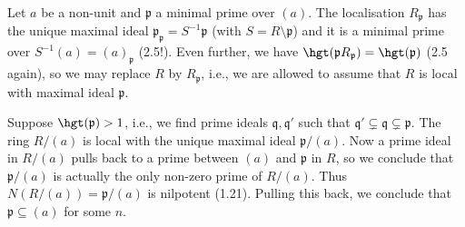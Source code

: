 Let $a$ be a non-unit and $\mathfrak{p}$ a minimal prime over $(a)$. The
localisation $R_{\mathfrak{p}}$ has the unique maximal ideal
$\mathfrak{p}_{\mathfrak{p}} = S^{-1}\mathfrak{p}$ (with $S = R\setminus \mathfrak{p}$)
and it is a minimal prime over $S^{-1}(a) = (a)_{\mathfrak{p}}$ (2.5!). Even
further, we have $\hgt(\mathfrak{p}R_{\mathfrak{p}}) = \hgt(\mathfrak{p})$ (2.5 again),
so we may replace $R$ by $R_{\mathfrak{p}}$, i.e., we are allowed to assume that
$R$ is local with maximal ideal $\mathfrak{p}$.

Suppose $\hgt(\mathfrak{p}) > 1$, i.e., we find prime ideals $\mathfrak{q}, \mathfrak{q}'$
such that $\mathfrak{q}' \subsetneq \mathfrak{q}\subsetneq \mathfrak{p}$. The
ring $R/(a)$ is local with the unique maximal ideal $\mathfrak{p}/(a)$. Now a prime
ideal in $R/(a)$ pulls back to a prime between $(a)$ and $\mathfrak{p}$ in $R$,
so we conclude that $\mathfrak{p}/(a)$ is actually the only non-zero prime of $R/(a)$.
Thus $N(R/(a)) = \mathfrak{p}/(a)$ is nilpotent (1.21). Pulling this back, we conclude
that $\mathfrak{p} \subseteq (a)$ for some $n$.
